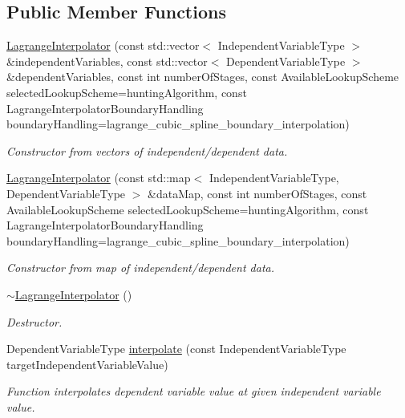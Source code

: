 \subsection*{Public Member Functions}
\begin{DoxyCompactItemize}
\item 
\hyperlink{classtudat_1_1interpolators_1_1LagrangeInterpolator_ad1fce556b4969276ef9ee2acb7e4a41a}{Lagrange\+Interpolator} (const std\+::vector$<$ Independent\+Variable\+Type $>$ \&independent\+Variables, const std\+::vector$<$ Dependent\+Variable\+Type $>$ \&dependent\+Variables, const int number\+Of\+Stages, const Available\+Lookup\+Scheme selected\+Lookup\+Scheme=hunting\+Algorithm, const Lagrange\+Interpolator\+Boundary\+Handling boundary\+Handling=lagrange\+\_\+cubic\+\_\+spline\+\_\+boundary\+\_\+interpolation)
\begin{DoxyCompactList}\small\item\em Constructor from vectors of independent/dependent data. \end{DoxyCompactList}\item 
\hyperlink{classtudat_1_1interpolators_1_1LagrangeInterpolator_a9c95512b4901363bb881483a66bd2cad}{Lagrange\+Interpolator} (const std\+::map$<$ Independent\+Variable\+Type, Dependent\+Variable\+Type $>$ \&data\+Map, const int number\+Of\+Stages, const Available\+Lookup\+Scheme selected\+Lookup\+Scheme=hunting\+Algorithm, const Lagrange\+Interpolator\+Boundary\+Handling boundary\+Handling=lagrange\+\_\+cubic\+\_\+spline\+\_\+boundary\+\_\+interpolation)
\begin{DoxyCompactList}\small\item\em Constructor from map of independent/dependent data. \end{DoxyCompactList}\item 
\hyperlink{classtudat_1_1interpolators_1_1LagrangeInterpolator_aa41b862da7b1ec1cb6783f65ab2634d9}{$\sim$\+Lagrange\+Interpolator} ()\hypertarget{classtudat_1_1interpolators_1_1LagrangeInterpolator_aa41b862da7b1ec1cb6783f65ab2634d9}{}\label{classtudat_1_1interpolators_1_1LagrangeInterpolator_aa41b862da7b1ec1cb6783f65ab2634d9}

\begin{DoxyCompactList}\small\item\em Destructor. \end{DoxyCompactList}\item 
Dependent\+Variable\+Type \hyperlink{classtudat_1_1interpolators_1_1LagrangeInterpolator_ada90e5c75857ef9246d582d24c74fc85}{interpolate} (const Independent\+Variable\+Type target\+Independent\+Variable\+Value)
\begin{DoxyCompactList}\small\item\em Function interpolates dependent variable value at given independent variable value. \end{DoxyCompactList}\end{DoxyCompactItemize}
